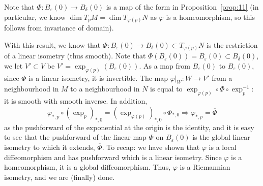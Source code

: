 \documentclass[aps,pra,showpacs,notitlepage,onecolumn,superscriptaddress,nofootinbib]{revtex4-1}
\theoremstyle{definition}
\newcommand{\hhrulefill}{\hspace{-1.5em} \hrulefill}
\begin{document}
    \noindent Note that $\Phi : B_{\varepsilon}(0) \rightarrow B_{\delta}(0)$ is a map of the form in Proposition~\ref{prop:11} (in particular, we know $\dim T_p M = \dim T_{\varphi(p)} N$ as $\varphi$ is a homeomorphism, so this follows from
    invariance of domain).
    \newline

    \noindent With this result, we know that $\Phi : B_{\varepsilon}(0) \rightarrow B_{\delta}(0) \subset T_{\varphi(p)} N$ is the restriction of a linear isometry (thus smooth).
    Note that $\Phi(B_{\varepsilon}(0)) = B_{\varepsilon}(0) \subset B_{\delta}(0)$, we let $V' \subset V$ be $V' = \exp_{\varphi(p)}(B_{\varepsilon}(0))$. As a map from $B_{\varepsilon}(0)$ to $B_{\varepsilon}(0)$,
    since $\Phi$ is a linear isometry, it is invertible. The map $\varphi|_W : W \rightarrow V'$ from a neighbourhood in $M$ to a neighbourhood in $N$
    is equal to $\exp_{\varphi(p)} \circ \Phi \circ \exp_p^{-1}$: it is smooth with smooth inverse. In addition,
    \begin{equation}
      \varphi_{*, p} \circ (\exp_p)_{*, 0} = (\exp_{\varphi(p)})_{*, 0} \circ \Phi_{*, 0} \Longrightarrow \varphi_{*, p} = \overline{\Phi}
    \end{equation}
    as the pushforward of the exponential at the origin is the identity, and it is easy to see that the pushforward of the linear map $\Phi$ on $B_{\varepsilon}(0)$ is the global linear isometry to which it extends, $\overline{\Phi}$.
    To recap: we have shown that $\varphi$ is a local diffeomorphism and has pushforward which is a linear isometry. Since $\varphi$ is a homeomorphism,
    it is a global diffeomorphism. Thus, $\varphi$ is a Riemannian isometry, and we are (finally) done.

\begin{comment}
      Note that due to this, $\Phi(B_{\varepsilon}(0)) \subset B_{\varepsilon}(0) \subset T_{\varphi(p)} N$, so $\varepsilon \leq \delta$,
      and we can shrink $\delta$ to think of $\Phi$ as a map from $B_{\varepsilon}(0)$ to $B_{\varepsilon}(0)$.
\end{comment}

    \hhrulefill
\end{document}

